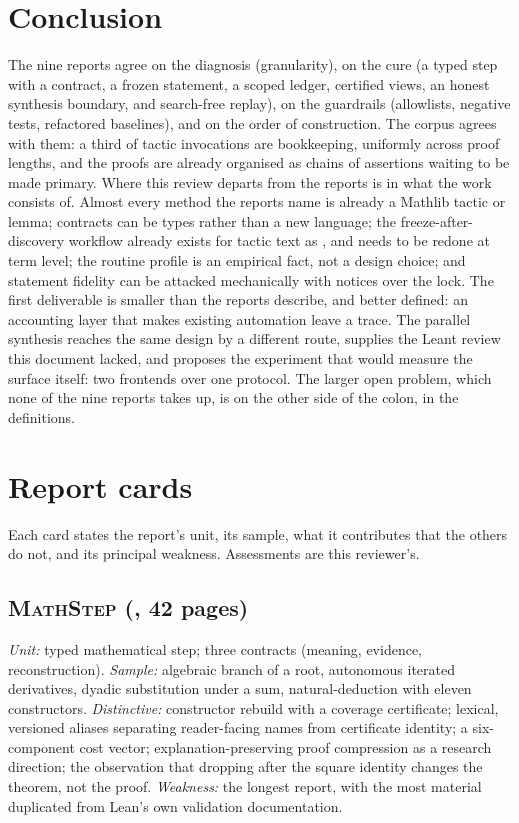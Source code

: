 \documentclass[11pt,a4paper]{article}
\newcommand{\code}[1]{\texttt{\detokenize{#1}}}
\newcommand{\MS}{\textsc{MathStep}}
\theoremstyle{definition}
\begin{document}
\section{Conclusion}
The nine reports agree on the diagnosis (granularity), on the cure (a typed step with a contract, a frozen statement, a scoped ledger, certified views, an honest synthesis boundary, and search-free replay), on the guardrails (allowlists, negative tests, refactored baselines), and on the order of construction. The corpus agrees with them: a third of tactic invocations are bookkeeping, uniformly across proof lengths, and the proofs are already organised as chains of assertions waiting to be made primary. Where this review departs from the reports is in what the work consists of. Almost every method the reports name is already a Mathlib tactic or lemma; contracts can be types rather than a new language; the freeze-after-discovery workflow already exists for tactic text as \code{says}, and needs to be redone at term level; the routine profile is an empirical fact, not a design choice; and statement fidelity can be attacked mechanically with notices over the lock. The first deliverable is smaller than the reports describe, and better defined: an accounting layer that makes existing automation leave a trace. The parallel synthesis reaches the same design by a different route, supplies the Leant review this document lacked, and proposes the experiment that would measure the surface itself: two frontends over one protocol. The larger open problem, which none of the nine reports takes up, is on the other side of the colon, in the definitions.

\appendix

\section{Report cards}
\label{app:cards}
Each card states the report's unit, its sample, what it contributes that the others do not, and its principal weakness. Assessments are this reviewer's.

\subsection*{\MS{} (\code{docs/ideas/MathStep}, 42 pages)}
\emph{Unit:} typed mathematical step; three contracts (meaning, evidence, reconstruction). \emph{Sample:} algebraic branch of a root, autonomous iterated derivatives, dyadic substitution under a sum, natural-deduction \code{mapAxioms} with eleven constructors. \emph{Distinctive:} \code{remaining =>} constructor rebuild with a coverage certificate; lexical, versioned aliases separating reader-facing names from certificate identity; a six-component cost vector; explanation-preserving proof compression as a research direction; the observation that dropping \code{hq} after the square identity changes the theorem, not the proof. \emph{Weakness:} the longest report, with the most material duplicated from Lean's own validation documentation.
\end{document}
